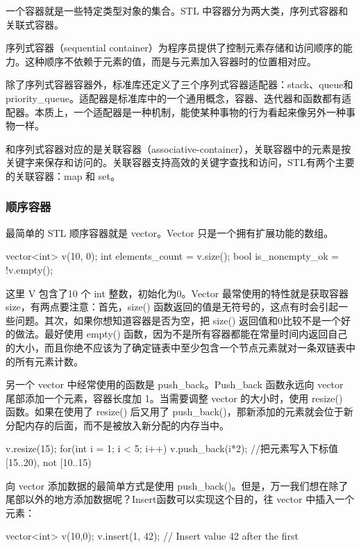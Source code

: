 一个容器就是一些特定类型对象的集合。STL 中容器分为两大类，序列式容器和关联式容器。

序列式容器（sequential container）为程序员提供了控制元素存储和访问顺序的能力。这种顺序不依赖于元素的值，而是与元素加入容器时的位置相对应。

除了序列式容器容器外，标准库还定义了三个序列式容器适配器：stack、queue和priority_queue。适配器是标准库中的一个通用概念，容器、迭代器和函数都有适配器。本质上，一个适配器是一种机制，能使某种事物的行为看起来像另外一种事物一样。

和序列式容器对应的是关联容器（associative-container），关联容器中的元素是按关键字来保存和访问的。关联容器支持高效的关键字查找和访问，STL有两个主要的关联容器：map 和 set。

\subsubsection {顺序容器}

最简单的 STL 顺序容器就是 vector。Vector 只是一个拥有扩展功能的数组。

\begin{Code}
vector<int> v(10, 0);
int elements_count = v.size();
bool is_nonempty_ok = !v.empty();
\end{Code}

这里 V 包含了10 个 int 整数，初始化为0。Vector 最常使用的特性就是获取容器size，有两点要注意：首先，size() 函数返回的值是无符号的，这点有时会引起一些问题。其次，如果你想知道容器是否为空，把 size() 返回值和0比较不是一个好的做法。最好使用 empty() 函数，因为不是所有容器都能在常量时间内返回自己的大小，而且你绝不应该为了确定链表中至少包含一个节点元素就对一条双链表中的所有元素计数。

另一个 vector 中经常使用的函数是 push_back。Push_back 函数永远向 vector 尾部添加一个元素，容器长度加 1。当需要调整 vector 的大小时，使用 resize() 函数。如果在使用了 resize() 后又用了 push_back()，那新添加的元素就会位于新分配内存的后面，而不是被放入新分配的内存当中。

\begin{Code}
v.resize(15);
for(int i = 1; i < 5; i++) {
	v.push_back(i*2);
	//把元素写入下标值[15..20), not [10..15)
}
\end{Code}

向 vector 添加数据的最简单方式是使用 push_back()。但是，万一我们想在除了尾部以外的地方添加数据呢？Insert函数可以实现这个目的，往 vector 中插入一个元素：

\begin{Code}
vector<int> v(10,0);
v.insert(1, 42);    // Insert value 42 after the first
\end{Code}

